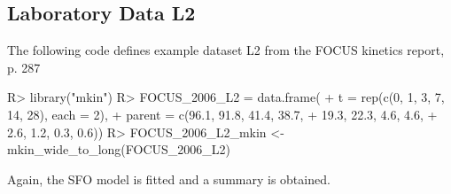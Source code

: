 \documentclass[12pt,a4paper]{article}
\begin{document}
\subsection{Laboratory Data L2}

The following code defines example dataset L2 from the FOCUS kinetics
report, p. 287

\begin{Schunk}
\begin{Sinput}
R> library("mkin")
R> FOCUS_2006_L2 = data.frame(
+   t = rep(c(0, 1, 3, 7, 14, 28), each = 2),
+   parent = c(96.1, 91.8, 41.4, 38.7,
+              19.3, 22.3, 4.6, 4.6,
+              2.6, 1.2, 0.3, 0.6))
R> FOCUS_2006_L2_mkin <- mkin_wide_to_long(FOCUS_2006_L2)
\end{Sinput}
\end{Schunk}

Again, the SFO model is fitted and a summary is obtained.
\end{document}
